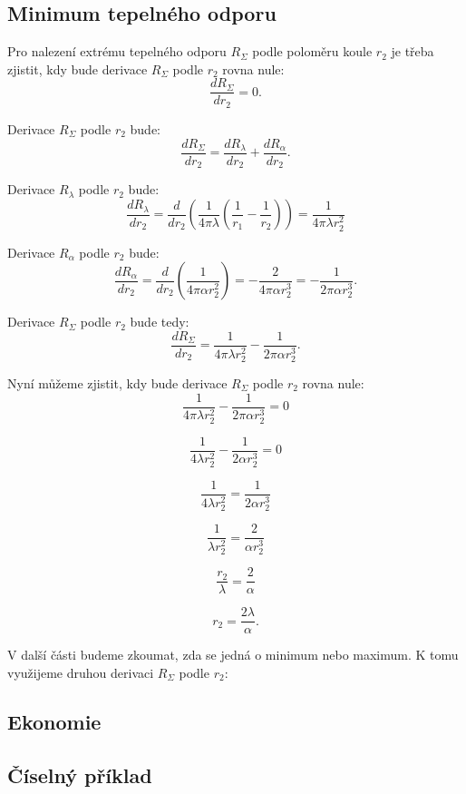 \documentclass{article}
\begin{document}
\subsection{Minimum tepelného odporu}

Pro nalezení extrému tepelného odporu $R_{\Sigma}$ podle poloměru koule $r_2$ je třeba zjistit, kdy bude derivace $R_{\Sigma}$ podle $r_2$ rovna nule:
$$
    \frac{dR_{\Sigma}}{dr_2} = 0.
$$

Derivace $R_{\Sigma}$ podle $r_2$ bude:
$$
    \frac{dR_{\Sigma}}{dr_2} = \frac{dR_{\lambda}}{dr_2} + \frac{dR_{\alpha}}{dr_2}.
$$

Derivace $R_{\lambda}$ podle $r_2$ bude:
$$
    \frac{dR_{\lambda}}{dr_2} = \frac{d}{dr_2} \left( \frac{1}{4 \pi \lambda} \left( \frac{1}{r_1} - \frac{1}{r_2} \right) \right) = \frac{1}{4 \pi \lambda r_2^2}
$$

Derivace $R_{\alpha}$ podle $r_2$ bude:
$$
    \frac{dR_{\alpha}}{dr_2} = \frac{d}{dr_2} \left( \frac{1}{4 \pi \alpha r_2^2} \right) = -\frac{2}{4 \pi \alpha r_2^3} = -\frac{1}{2 \pi \alpha r_2^3}.
$$

Derivace $R_{\Sigma}$ podle $r_2$ bude tedy:
$$
    \frac{dR_{\Sigma}}{dr_2} = \frac{1}{4 \pi \lambda r_2^2} - \frac{1}{2 \pi \alpha r_2^3}.
$$

Nyní můžeme zjistit, kdy bude derivace $R_{\Sigma}$ podle $r_2$ rovna nule:
$$
    \frac{1}{4 \pi \lambda r_2^2} - \frac{1}{2 \pi \alpha r_2^3} = 0
$$

$$
    \frac{1}{4 \lambda r_2^2} - \frac{1}{2 \alpha r_2^3} = 0
$$

$$
    \frac{1}{4 \lambda r_2^2} = \frac{1}{2 \alpha r_2^3}
$$

$$
    \frac{1}{\lambda r_2^2} = \frac{2}{\alpha r_2^3}
$$

$$
    \frac{r_2}{\lambda} = \frac{2}{\alpha}
$$

$$
    r_2 = \frac{2 \lambda}{\alpha}.
$$

V další části budeme zkoumat, zda se jedná o minimum nebo maximum. K tomu využijeme druhou derivaci $R_{\Sigma}$ podle $r_2$:

\begin{center}
\end{center}


\subsection{Ekonomie}


\subsection{Číselný příklad}
\end{document}
